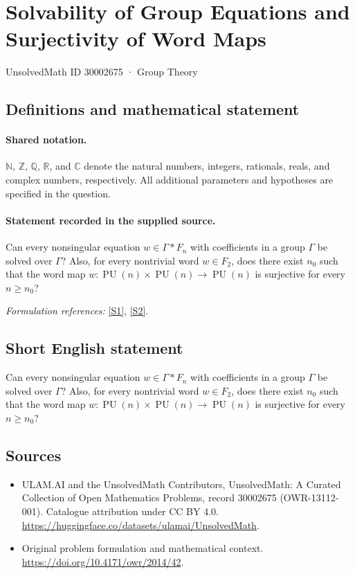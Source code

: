 \documentclass[11pt]{article}
\newcommand{\sref}[2]{\hyperlink{source:#1:#2}{[S#2]}}
\begin{document}
\setcounter{section}{30002674}
\section{Solvability of Group Equations and Surjectivity of Word Maps}\label{30002675}
{\small UnsolvedMath ID 30002675 · Group Theory}
\subsection{Definitions and mathematical statement}

\paragraph{Shared notation.}$\mathbb N$, $\mathbb Z$, $\mathbb Q$, $\mathbb R$, and $\mathbb C$ denote the natural numbers, integers, rationals, reals, and complex numbers, respectively. All additional parameters and hypotheses are specified in the question.


\paragraph{Statement recorded in the supplied source.}
Can every nonsingular equation $w\in\Gamma*F_n$ with coefficients in a group $\Gamma$ be solved over $\Gamma$? Also, for every nontrivial word $w\in F_2$, does there exist $n_0$ such that the word map $w:\operatorname{PU}(n)\times\operatorname{PU}(n)\to\operatorname{PU}(n)$ is surjective for every $n\geq n_0$?
\par\smallskip\textit{Formulation references:} \sref{30002675}{1}, \sref{30002675}{2}.
\subsection{Short English statement}
Can every nonsingular equation $w\in\Gamma*F_n$ with coefficients in a group $\Gamma$ be solved over $\Gamma$? Also, for every nontrivial word $w\in F_2$, does there exist $n_0$ such that the word map $w:\operatorname{PU}(n)\times\operatorname{PU}(n)\to\operatorname{PU}(n)$ is surjective for every $n\geq n_0$?
\subsection{Sources}
\begin{itemize}
\item[\hypertarget{source:30002675:1}{S1}] ULAM.AI and the UnsolvedMath Contributors, UnsolvedMath: A Curated Collection of Open Mathematics Problems, record 30002675 (OWR-13112-001). Catalogue attribution under CC BY 4.0.
\url{https://huggingface.co/datasets/ulamai/UnsolvedMath}.
\item[\hypertarget{source:30002675:2}{S2}] Original problem formulation and mathematical context.
\url{https://doi.org/10.4171/owr/2014/42}.
\end{itemize}
\label{end:30002675}
\end{document}

